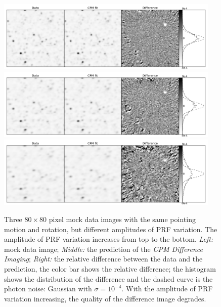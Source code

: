 \documentclass[12pt, preprint]{aastex}
\newcommand{\project}[1]{\textsl{#1}}
\newcommand{\cpmdiff}{\project{CPM Difference Imaging}}
\begin{document}
\begin{figure}[p]
\begin{center}
\includegraphics[width=0.95\textwidth]{f9a}
\includegraphics[width=0.95\textwidth]{f9b}
\includegraphics[width=0.95\textwidth]{f9c}
\end{center}
\caption{
  \label{large_prf}
  Three $80\times 80$ pixel mock data images with the same pointing motion and rotation, but different amplitudes of PRF variation. The amplitude of PRF variation increases from top to the bottom.
  \emph{Left:} mock data image;
  \emph{Middle:} the prediction of the \cpmdiff;
  \emph{Right:} the relative difference between the data and the prediction, the color bar shows the relative difference; the histogram shows the distribution of the difference and the dashed curve is the photon noise: Gaussian with $\sigma = 10^{-4}$. 
  With the amplitude of PRF variation increasing, the quality of the difference image degrades.
}
\end{figure}
\end{document}
